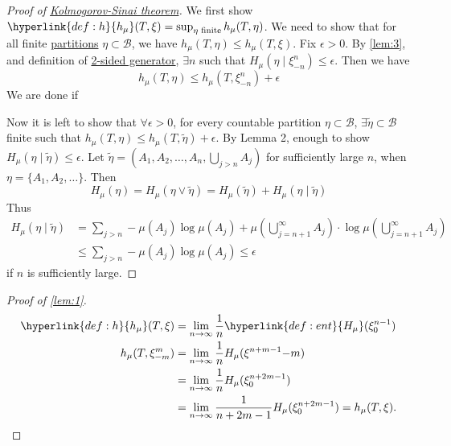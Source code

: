 \documentclass{article}
\begin{document}
\begin{proof}[Proof of \hyperlink{thm:ks}{Kolmogorov-Sinai theorem}]
  \color{gray}
  We first show $\hyperlink{def:h}{h_\mu}(T, \xi) = \sup_{\eta\text{ finite}} h_\mu(T,\eta)$.
  We need to show that for all finite \hyperlink{def:partition}{partitions} $\eta \subset \mathcal{B}$, we have $h_\mu(T, \eta) \leq h_\mu(T, \xi)$.
  Fix $\epsilon > 0$. By \cref{lem:3}, and definition of \hyperlink{def:gen}{2-sided generator}, $\exists n$ such that $H_\mu(\eta \mid \xi^n_{-n}) \leq \epsilon$.
  Then we have
  \begin{equation*}
    h_\mu(T, \eta) \leq h_\mu(T, \xi^{n}_{-n}) + \epsilon %
  \end{equation*}
  We are done if %

  Now it is left to show that $\forall \epsilon > 0$, for every countable partition $\eta \subset \mathcal{B}$, $\exists \tilde{\eta} \subset \mathcal{B}$ finite such that $h_\mu(T,\eta) \leq h_\mu(T, \tilde{\eta}) + \epsilon$.
  By Lemma 2, enough to show $H_\mu(\eta \mid \tilde{\eta}) \leq \epsilon$.
  Let $\tilde{\eta} = (A_1, A_2, \dotsc, A_n, \bigcup_{j > n} A_j)$ for sufficiently large $n$, when $\eta = \{A_1, A_2, \dotsc\}$.
  Then
  \begin{equation*}
    H_\mu(\eta) = H_\mu(\eta \vee \tilde{\eta}) = H_\mu(\tilde{\eta}) + H_\mu(\eta \mid \tilde{\eta})
  \end{equation*}
  Thus
  \begin{align*}
    H_\mu(\eta \mid \tilde{\eta}) &= \sum_{j > n} -\mu(A_j) \log \mu(A_j) + \mu\left(\bigcup_{j={n+1}}^\infty A_j\right) \cdot  \log \mu\left(\bigcup_{j=n+1}^\infty A_j\right) \\
                                  &\leq \sum_{j > n} - \mu(A_j) \log \mu(A_j) \leq \epsilon
  \end{align*}
  if $n$ is sufficiently large.
\end{proof}
\color{black}
\begin{proof}[Proof of \cref{lem:1}]
  \begin{align*}
    \hyperlink{def:h}{h_\mu}(T, \xi) &= \lim_{n \to \infty} \frac{1}{n} \hyperlink{def:ent}{H_\mu}(\xi_0^{n-1}) \\
    h_\mu(T, \xi^m_{-m}) &= \lim_{n \to \infty} \frac{1}{n} H_\mu(\xi^{n+m-1}{-m}) \\
                         &= \lim_{n \to \infty} \frac{1}{n} H_\mu(\xi^{n+2m-1}_0) \\
                         &= \lim_{n \to \infty} \frac{1}{n+2m-1} H_\mu(\xi^{n+2m-1}_0) = h_\mu(T, \xi). \qedhere
  \end{align*}
\end{proof}
\end{document}
